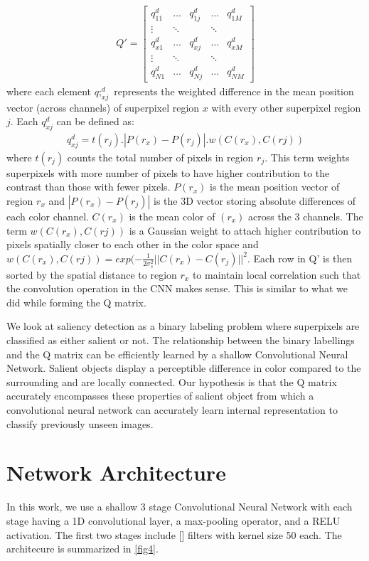 \documentclass[journal]{IEEEtran}
\begin{document}
{\begin{align*}
Q' = \begin{bmatrix}
q_{11}^d&\dots&q_{1j}^d&\dots&q_{1M}^d\\
\vdots&\ddots&&\ddots&\\
q_{x1}^d&\dots&q_{xj}^d&\dots&q_{xM}^d\\
\vdots&\ddots&&\ddots&\\
q_{N1}^d&\dots&q_{Nj}^d&\dots&q_{NM}^d
\end{bmatrix}
\end{align*}
where each element $q;_{xj}^d$ represents the weighted difference in the mean position vector (across channels) of superpixel region $x$ with every other superpixel region $j$. Each $q_{xj}^d$ can be defined as: 
\begin{align*}
q_{xj}^d = t(r_j).|P(r_x)-P(r_j)|.w(C(r_x),C(rj))
\end{align*}
where $t(r_j)$ counts the total number of pixels in region $r_j$. This term weights superpixels with more number of pixels to have higher contribution to the contrast than those with fewer pixels. $P(r_x)$ is the mean position vector of region $r_x$ and $|P(r_x)-P(r_j)|$ is the 3D vector storing absolute differences of each color channel. $C(r_x)$ is the mean color of $(r_x)$ across the 3 channels. The term $w(C(r_x),C(rj))$ is a Gaussian weight to attach higher contribution to pixels spatially closer to each other in the color space and $w(C(r_x),C(rj)) = exp(-\frac{1}{2\sigma_s^2}||C(r_x)-C(r_j)||^2$. Each row in Q' is then sorted by the spatial distance to region $r_x$ to maintain local correlation such that the convolution operation in the CNN makes sense. This is similar to what we did while forming the Q matrix.

 



We look at saliency detection as a binary labeling problem where superpixels are classified as either salient or not. The relationship between the binary labellings and the Q matrix can be efficiently learned by a shallow Convolutional Neural Network. Salient objects display a perceptible difference in color compared to the surrounding and are locally connected. Our hypothesis is that the Q matrix accurately encompasses these properties of salient object from which a convolutional neural network can accurately learn internal representation to classify previously unseen images. 

\section{Network Architecture}
In this work, we use a shallow 3 stage Convolutional Neural Network with each stage having a 1D convolutional layer, a max-pooling operator, and a RELU activation. The first two stages include [] filters with kernel size 50 each. The architecure is summarized in \ref{fig4}.

}
\end{document}
